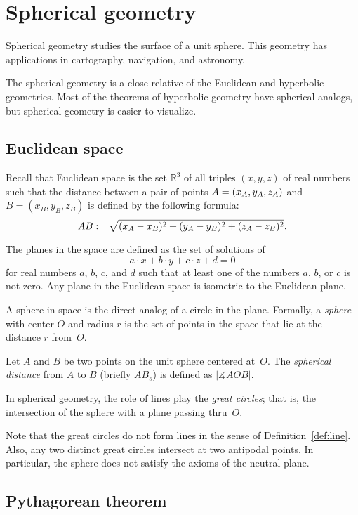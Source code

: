\chapter{Spherical geometry}
\label{chap:sphere}

Spherical geometry studies the surface of a unit sphere.
This geometry has applications in cartography, navigation, and astronomy.

The spherical geometry is a close relative of the Euclidean and hyperbolic geometries.
Most of the theorems of hyperbolic geometry have spherical analogs,
but spherical geometry is easier to visualize. 

\section{Euclidean space}

Recall that Euclidean space is the set $\mathbb{R}^3$ of all triples $(x,y,z)$ of real numbers
such that the distance between a pair of points
$A\z=(x_A,y_A,z_A)$ and $B=(x_B,y_B,z_B)$
is defined by the following formula:
$$AB
:=
\sqrt{(x_A-x_B)^2+(y_A-y_B)^2+(z_A-z_B)^2}.$$

The planes in the space are defined as the set of solutions of 
$$a\cdot x+b\cdot y+c\cdot z+d=0$$ 
for real numbers $a$, $b$, $c$, and $d$ such that at least one of the numbers $a$, $b$, or $c$ is not zero.
Any plane in the Euclidean space is isometric to the Euclidean plane.

A sphere in space is the direct analog of a circle in the plane.
Formally, a \emph{sphere} with center $O$ and radius $r$ is the set of points in the space that lie at the distance $r$ from~$O$.

Let $A$ and $B$ be two points on the unit sphere centered at~$O$.
The \emph{spherical distance} from $A$ to $B$
(briefly $AB_s$)
 is defined as  $|\measuredangle AOB|$. 

In spherical geometry, the role of lines play the \emph{great circles};
that is, the intersection of the sphere with a plane passing thru~$O$.

Note that the great circles do not form lines in the sense of Definition~\ref{def:line}.
Also, any two distinct great circles intersect at two antipodal points.
In particular, the sphere does not satisfy the axioms of the neutral plane.

\section{Pythagorean theorem}

